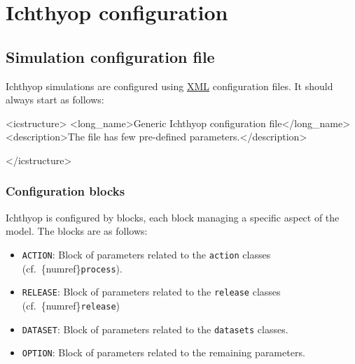 \documentclass[
  letterpaper,
  DIV=11,
  numbers=noendperiod]{scrreprt}
\newenvironment{Shaded}{\begin{snugshade}}{\end{snugshade}}
\newcommand{\KeywordTok}[1]{\textcolor[rgb]{0.00,0.23,0.31}{#1}}
\newcommand{\NormalTok}[1]{\textcolor[rgb]{0.00,0.23,0.31}{#1}}
\providecommand{\tightlist}{%
  \setlength{\itemsep}{0pt}\setlength{\parskip}{0pt}}\usepackage{longtable,booktabs,array}
\begin{document}
\chapter{Ichthyop configuration}\label{ichthyop-configuration}

\section{Simulation configuration file}\label{sec-xml-config}

Ichthyop simulations are configured using
\href{https://en.wikipedia.org/wiki/XML}{XML} configuration files. It
should always start as follows:

\begin{Shaded}
\begin{Highlighting}[]
\NormalTok{\textless{}}\KeywordTok{icstructure}\NormalTok{\textgreater{}}
\NormalTok{\textless{}}\KeywordTok{long\_name}\NormalTok{\textgreater{}Generic Ichthyop configuration file\textless{}/}\KeywordTok{long\_name}\NormalTok{\textgreater{}}
\NormalTok{\textless{}}\KeywordTok{description}\NormalTok{\textgreater{}The file has few pre{-}defined parameters.\textless{}/}\KeywordTok{description}\NormalTok{\textgreater{}}

\NormalTok{\textless{}/}\KeywordTok{icstructure}\NormalTok{\textgreater{}}
\end{Highlighting}
\end{Shaded}

\subsection{Configuration blocks}\label{configuration-blocks}

Ichthyop is configured by blocks, each block managing a specific aspect
of the model. The blocks are as follows:

\begin{itemize}
\tightlist
\item
  \texttt{ACTION}: Block of parameters related to the \texttt{action}
  classes (cf.~\{numref\}\texttt{process}).
\item
  \texttt{RELEASE}: Block of parameters related to the \texttt{release}
  classes (cf.~\{numref\}\texttt{release})
\item
  \texttt{DATASET}: Block of parameters related to the \texttt{datasets}
  classes.
\item
  \texttt{OPTION}: Block of parameters related to the remaining
  parameters.
\end{itemize}
\end{document}
